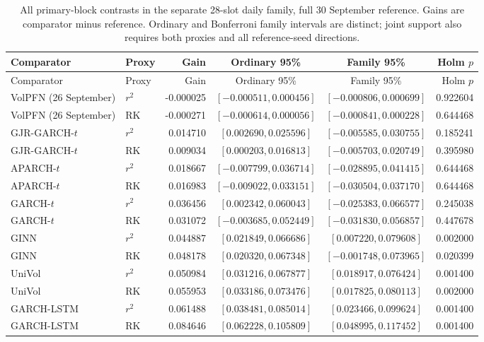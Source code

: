 \begingroup\footnotesize\setlength{\tabcolsep}{2pt}
\begin{longtable}{@{}>{\raggedright\arraybackslash}p{2.0cm}lrccr@{}}
\caption[Complete common-period daily inference]{All primary-block contrasts in the separate 28-slot daily family, full 30 September reference. Gains are comparator minus reference. Ordinary and Bonferroni family intervals are distinct; joint support also requires both proxies and all reference-seed directions.}\label{tab:new-daily-inference}\\
\toprule
Comparator & Proxy & Gain & Ordinary 95\% & Family 95\% & Holm $p$ \\
\midrule\endfirsthead
\toprule
Comparator & Proxy & Gain & Ordinary 95\% & Family 95\% & Holm $p$ \\
\midrule\endhead
VolPFN (26 September) & $r^2$ & -0.000025 & $[-0.000511,0.000456]$ & $[-0.000806,0.000699]$ & 0.922604 \\
VolPFN (26 September) & RK & -0.000271 & $[-0.000614,0.000056]$ & $[-0.000841,0.000228]$ & 0.644468 \\
GJR-GARCH-$t$ & $r^2$ & 0.014710 & $[0.002690,0.025596]$ & $[-0.005585,0.030755]$ & 0.185241 \\
GJR-GARCH-$t$ & RK & 0.009034 & $[0.000203,0.016813]$ & $[-0.005703,0.020749]$ & 0.395980 \\
APARCH-$t$ & $r^2$ & 0.018667 & $[-0.007799,0.036714]$ & $[-0.028895,0.041415]$ & 0.644468 \\
APARCH-$t$ & RK & 0.016983 & $[-0.009022,0.033151]$ & $[-0.030504,0.037170]$ & 0.644468 \\
GARCH-$t$ & $r^2$ & 0.036456 & $[0.002342,0.060043]$ & $[-0.025383,0.066577]$ & 0.245038 \\
GARCH-$t$ & RK & 0.031072 & $[-0.003685,0.052449]$ & $[-0.031830,0.056857]$ & 0.447678 \\
GINN & $r^2$ & 0.044887 & $[0.021849,0.066686]$ & $[0.007220,0.079608]$ & 0.002000 \\
GINN & RK & 0.048178 & $[0.020320,0.067348]$ & $[-0.001748,0.073965]$ & 0.020399 \\
UniVol & $r^2$ & 0.050984 & $[0.031216,0.067877]$ & $[0.018917,0.076424]$ & 0.001400 \\
UniVol & RK & 0.055953 & $[0.033186,0.073476]$ & $[0.017825,0.080113]$ & 0.002000 \\
GARCH-LSTM & $r^2$ & 0.061488 & $[0.038481,0.085014]$ & $[0.023466,0.099624]$ & 0.001400 \\
GARCH-LSTM & RK & 0.084646 & $[0.062228,0.105809]$ & $[0.048995,0.117452]$ & 0.001400 \\

\end{longtable}
